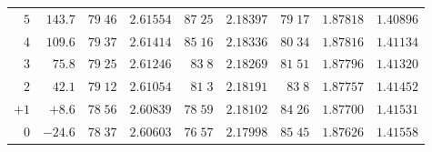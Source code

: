 \begin{center}
\begin{tabular}{r|r|r|r|r|r|r|r|r}
$5$&$143.7$&$79\;46$&$2.61554$&$87\;25$&$2.18397$&$79\;17$&$1.87818$&$1.40896$\\
$4$&$109.6$&$79\;37$&$2.61414$&$85\;16$&$2.18336$&$80\;34$&$1.87816$&$1.41134$\\
$3$&$75.8$&$79\;25$&$2.61246$&$83\;8$&$2.18269$&$81\;51$&$1.87796$&$1.41320$\\
$2$&$42.1$&$79\;12$&$2.61054$&$81\;3$&$2.18191$&$83\;8$&$1.87757$&$1.41452$\\
$+1$&$+8.6$&$78\;56$&$2.60839$&$78\;59$&$2.18102$&$84\;26$&$1.87700$&$1.41531$\\[2pt]
$0$&$-24.6$&$78\;37$&$2.60603$&$76\;57$&$2.17998$&$85\;45$&$1.87626$&$1.41558$\\
\hline
\end{tabular}
\end{center}
\endgroup
\clearpage
{}
\begingroup
\fontsize{9}{10.2}\selectfont
\setlength{\tabcolsep}{1.5pt}
\renewcommand{\arraystretch}{1.02}
